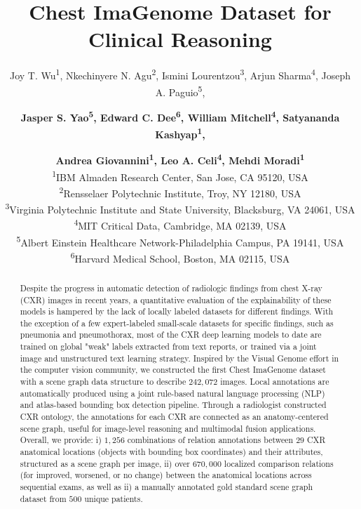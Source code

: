 \documentclass{article}
\title{Chest ImaGenome Dataset for Clinical Reasoning}
\author{Joy T. Wu\textsuperscript{1}, Nkechinyere N. Agu\textsuperscript{2}, Ismini Lourentzou\textsuperscript{3}, Arjun Sharma\textsuperscript{4}, Joseph A. Paguio\textsuperscript{5}, \and \textbf{Jasper S. Yao\textsuperscript{5}, Edward C. Dee\textsuperscript{6}, William Mitchell\textsuperscript{4}, Satyananda Kashyap\textsuperscript{1},} \and \textbf{Andrea Giovannini\textsuperscript{1}, Leo A. Celi\textsuperscript{4}, Mehdi Moradi\textsuperscript{1}} \\
\textsuperscript{1}{IBM Almaden Research Center, San Jose, CA 95120, USA}\\
\textsuperscript{2}{Rensselaer Polytechnic Institute, Troy, NY 12180, USA}\\
\textsuperscript{3}{Virginia Polytechnic Institute and State University, Blacksburg, VA 24061, USA}\\
\textsuperscript{4}{MIT Critical Data, Cambridge, MA 02139, USA}\\
\textsuperscript{5}{Albert Einstein Healthcare Network-Philadelphia Campus, PA 19141, USA}\\
\textsuperscript{6}{Harvard Medical School, Boston, MA 02115, USA} \\
}
\begin{document}
\maketitle

\begin{abstract}
Despite the progress in automatic detection of radiologic findings from chest X-ray (CXR) images in recent years, a quantitative evaluation of the explainability of these models is hampered by the lack of locally labeled datasets for different findings. With the exception of a few expert-labeled small-scale datasets for specific findings, such as pneumonia and pneumothorax, most of the CXR deep learning models to date are trained on global "weak" labels extracted from text reports, or trained via a joint image and unstructured text learning strategy. Inspired by the Visual Genome effort in the computer vision community, we constructed the first Chest ImaGenome dataset with a scene graph data structure to describe $242,072$ images. Local annotations are automatically produced using a joint rule-based natural language processing (NLP) and atlas-based bounding box detection pipeline. Through a radiologist constructed CXR ontology, the annotations for each CXR are connected as an anatomy-centered scene graph, useful for image-level reasoning and multimodal fusion applications. Overall, we provide: i) $1,256$ combinations of relation annotations between $29$ CXR anatomical locations (objects with bounding box coordinates) and their attributes, structured as a scene graph per image, ii) over $670,000$ localized comparison relations (for improved, worsened, or no change) between the anatomical locations across sequential exams, as well as ii) a manually annotated gold standard scene graph dataset from $500$ unique patients.

\end{abstract}








% 
% 
% 
% 




\newpage
%

\newpage

%
\end{document}
